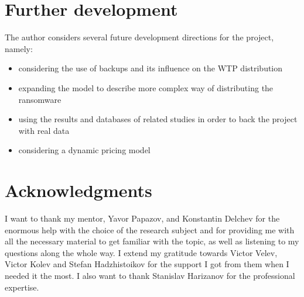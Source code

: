 \documentclass[11pt, a4paper]{article}
\theoremstyle{definition}
\begin{document}
\section{Further development}
	The author considers several future development directions for the project, namely:
	\begin{itemize}
		\item considering the use of backups and its influence on the WTP distribution
		\item expanding the model to describe more complex way of distributing the ransomware
		\item using the results and databases of related studies in order to back the project with real data\cite{paquet2019ransomware}
		\item considering a dynamic pricing model
	\end{itemize}
\section{Acknowledgments}
I want to thank my mentor, Yavor Papazov, and Konstantin Delchev for the enormous help with the choice of the research subject and for providing me with all the necessary material to get familiar with the topic, as well as listening to my questions along the whole way. I extend my gratitude towards Victor Velev, Victor Kolev and Stefan Hadzhistoikov for the support I got from them when I needed it the most. I also want to thank Stanislav Harizanov for the professional expertise.

\nocite{*}

\end{document}
